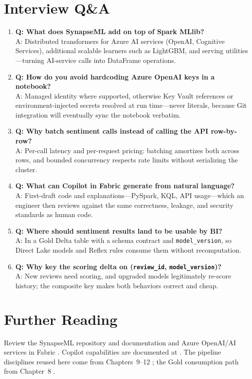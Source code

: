 \section{Interview Q\&A}
\begin{enumerate}
    \item \textbf{Q: What does SynapseML add on top of Spark MLlib?}\\
    A: Distributed transformers for Azure AI services (OpenAI, Cognitive Services), additional scalable learners such as LightGBM, and serving utilities---turning AI-service calls into DataFrame operations.
    \item \textbf{Q: How do you avoid hardcoding Azure OpenAI keys in a notebook?}\\
    A: Managed identity where supported, otherwise Key Vault references or environment-injected secrets resolved at run time---never literals, because Git integration will eventually sync the notebook verbatim.
    \item \textbf{Q: Why batch sentiment calls instead of calling the API row-by-row?}\\
    A: Per-call latency and per-request pricing: batching amortizes both across rows, and bounded concurrency respects rate limits without serializing the cluster.
    \item \textbf{Q: What can Copilot in Fabric generate from natural language?}\\
    A: First-draft code and explanations---PySpark, KQL, API usage---which an engineer then reviews against the same correctness, leakage, and security standards as human code.
    \item \textbf{Q: Where should sentiment results land to be usable by BI?}\\
    A: In a Gold Delta table with a schema contract and \texttt{model\_version}, so Direct Lake models and Reflex rules consume them without recomputation.
    \item \textbf{Q: Why key the scoring delta on (\texttt{review\_id}, \texttt{model\_version})?}\\
    A: New reviews need scoring, and upgraded models legitimately re-score history; the composite key makes both behaviors correct and cheap.
\end{enumerate}

\section{Further Reading}
Review the SynapseML repository and documentation \cite{synapseML} and Azure OpenAI/AI services in Fabric \cite{microsoftFabricAiServices}. Copilot capabilities are documented at \cite{microsoftFabricCopilot}. The pipeline disciplines reused here come from Chapters~9--12 \cite{microsoftFabricPipelines,microsoftFabricMonitoringHub}; the Gold consumption path from Chapter~8 \cite{microsoftDirectLake}.

